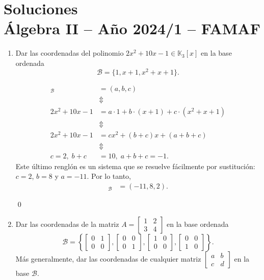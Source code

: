 \chapter{Soluciones\\Álgebra  II -- Año 2024/1 -- FAMAF}\label{practico-8}

\begin{enumerate}[topsep=6pt, itemsep=.4cm]

\item Dar las coordenadas del polinomio $2x^2+10x-1\in\mathbb{K}_3[x]$ en la base ordenada $$\mathcal{B}=\{1,x+1,x^2+x+1\}.$$

\rta 
\begin{align*}
    [2x^2+10x-1]_{\mathcal{B}}&= (a,b,c) \\
    &\Updownarrow \\
    2x^2+10x-1&=a\cdot 1+b\cdot (x+1)+c\cdot (x^2+x+1) \\
    &\Updownarrow \\
    2x^2+10x-1&=cx^2+(b+c)x+(a+b+c) \\ 
    &\Updownarrow \\
    c=2,\; b+c &= 10, \;a+b+c=-1.
\end{align*}
Este último renglón es un sistema que se resuelve fácilmente por sustitución: $c=2$, $b=8$ y $a=-11$. Por lo tanto,
\begin{align*}
    [2x^2+10x-1]_{\mathcal{B}}&= (-11,8,2).
\end{align*}

\qed


\item Dar las coordenadas de la matriz 
$A=\begin{bmatrix}
    1&2\\3&4 
    \end{bmatrix}
$ en la base ordenada 
$$
\mathcal{B}=\left\{
\begin{bmatrix}
    0&1\\0&0 
    \end{bmatrix},
\begin{bmatrix}
    0&0\\0&1 
    \end{bmatrix},
    \begin{bmatrix}
    1&0\\0&0 
    \end{bmatrix},
    \begin{bmatrix}
    0&0\\1&0 
    \end{bmatrix}
\right\}.
$$
Más generalmente, dar las coordenadas de cualquier matriz $\begin{bmatrix}
    a&b\\c&d 
    \end{bmatrix}$ en la base $\mathcal{B}$.


\end{enumerate}

